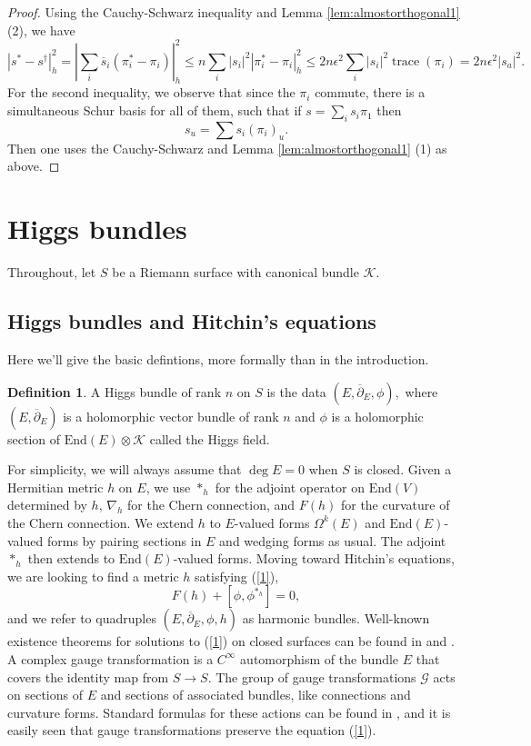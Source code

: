 \documentclass[10pt]{amsart}
\theoremstyle{definition}
\newtheorem{defn}[thm]{Definition}
\DeclareMathOperator{\tr}{\textrm{trace}}
\begin{document}
\begin{proof} Using the Cauchy-Schwarz inequality and Lemma \ref{lem:almostorthogonal1} (2), we have
\[
    |s^* - s^\dagger|_h^2 = |\sum_i \overline{s}_i(\pi_i^* - \pi_i)|^2_h \leq n\sum_i |s_i|^2|\pi_i^* - \pi_i|^2_h \leq 2n\epsilon^2 \sum_i |s_i|^2 \tr(\pi_i) = 2n\epsilon^2 |s_a|^2.
\]
For the second inequality, we observe that since the $\pi_i$ commute, there is a simultaneous Schur basis for all of them, such that if $s = \sum_i s_i \pi_1$ then 
\[
s_u = \sum s_i (\pi_i)_u.
\]
Then one uses the Cauchy-Schwarz and Lemma \ref{lem:almostorthogonal1} (1) as above.
\end{proof}




\section{Higgs bundles}\label{prelimhiggs}

Throughout, let $S$ be a Riemann surface with canonical bundle $\mathcal{K}.$ 

\subsection{Higgs bundles and Hitchin's equations}\label{Higgsintro}
Here we'll give the basic defintions, more formally than in the introduction.
\begin{defn}
A Higgs bundle of rank $n$ on $S$ is the data $(E,\overline{\partial}_E,\phi),$ where $(E,\overline{\partial}_E)$ is a holomorphic vector bundle of rank $n$ and $\phi$ is a holomorphic section of $\textrm{End}(E)\otimes \mathcal{K}$ called the Higgs field.
\end{defn}
For simplicity, we will always assume that $\deg E=0$ when $S$ is closed. Given a Hermitian metric $h$ on $E$, we use $*_h$ for the adjoint operator on $\textrm{End}(V)$ determined by $h$, $\nabla_h$ for the Chern connection, and $F(h)$ for the curvature of the Chern connection. We extend $h$ to $E$-valued forms $\Omega^k(E)$ and $\textrm{End}(E)$-valued forms by pairing sections in $E$ and wedging forms as usual. The adjoint $*_h$ then extends to $\textrm{End}(E)$-valued forms. Moving toward Hitchin's equations, we are looking to find a metric $h$ satisfying (\ref{1}), $$F(h) + [\phi,\phi^{*_h}]=0,$$ and we refer to quadruples $(E,\overline{\partial}_E,\phi,h)$ as harmonic bundles. Well-known existence theorems for solutions to (\ref{1}) on closed surfaces can be found in \cite{Hi} and \cite{Si}. A complex gauge transformation is a $C^\infty$ automorphism of the bundle $E$ that covers the identity map from $S\to S$. The group of gauge transformations $\mathcal{G}$ acts on sections of $E$ and sections of associated bundles, like connections and curvature forms. Standard formulas for these actions can be found in \cite[Chapter 2]{DK}, and it is easily seen that gauge transformations preserve the equation (\ref{1}).
\end{document}
